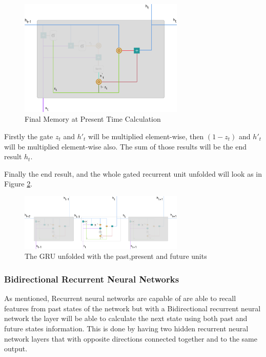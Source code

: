 \begin{figure}[htp]
	\centering
	\includegraphics[width=0.7\textwidth]{Illustrations/GRUlaststep.png}
	\caption{Final Memory at Present Time Calculation}
	\label{fig:GRUlaststep}
\end{figure}


Firstly the gate $z_t$ and $h'_t$ will be multiplied element-wise, then $(1-z_t)$ and $h'_t$ will be multiplied element-wise also. The sum of those results will be the end result $h_t$. 

Finally the end result, and the whole gated recurrent unit unfolded will look as in Figure \ref{fig:GRUunfolded}.

\begin{figure}[htp]
	\centering
	\includegraphics[width=0.7\textwidth]{Illustrations/GRUunfolded.png}
	\caption{The GRU unfolded with the past,present and future units}
	\label{fig:GRUunfolded}
\end{figure}

\newpage
\subsubsection{Bidirectional Recurrent Neural Networks} 
As mentioned, Recurrent neural networks are capable of are able to recall features from past states of the network but with a Bidirectional recurrent neural network the layer will be able to calculate the next state using both past and future states information. This is done by having two hidden recurrent neural network layers that with opposite directions connected together and to the same output. 

